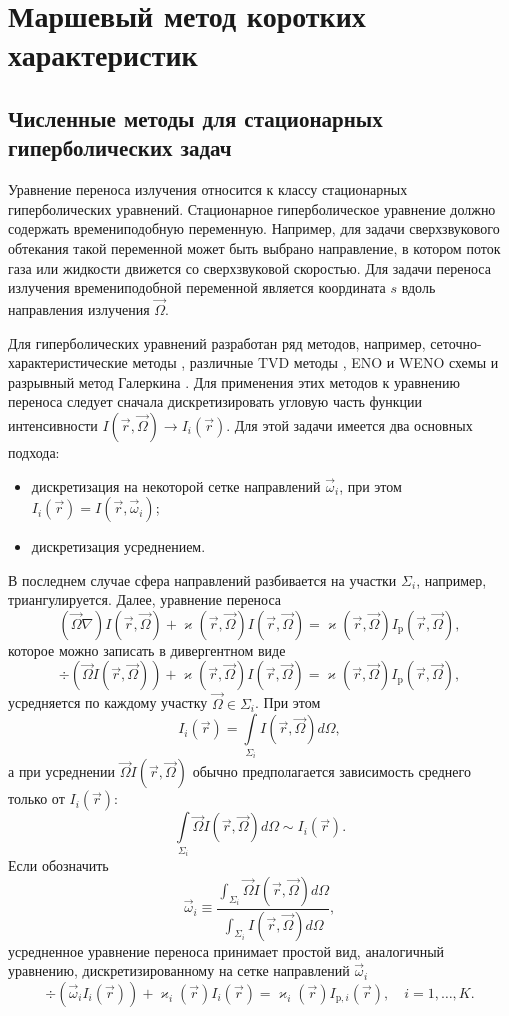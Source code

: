 \chapter{Маршевый метод коротких характеристик}

\section{Численные методы для стационарных гиперболических задач}

Уравнение переноса излучения относится к классу стационарных гиперболических уравнений. Стационарное гиперболическое уравнение должно содержать времениподобную переменную. Например, для задачи сверхзвукового обтекания такой переменной может быть выбрано направление, в котором поток газа или жидкости движется со сверхзвуковой скоростью. Для задачи переноса излучения времениподобной переменной является координата $s$ вдоль направления излучения $\vec \Omega$. 

Для гиперболических уравнений разработан ряд методов, например, сеточно-характеристические методы \cite{magometov1988}, различные TVD методы \cite{Godunov1959,vanLeer1974,Leveque2002,Toro2009}, ENO и WENO схемы \cite{Shu1998} и разрывный метод Галеркина \cite{Cockburn1989}. Для применения этих методов к уравнению переноса следует сначала дискретизировать угловую часть функции интенсивности $I(\vec r, \vec \Omega) \to I_i(\vec r)$. Для этой задачи имеется два основных подхода:
\begin{itemize}
\item дискретизация на некоторой сетке направлений $\vec \omega_i$, при этом $I_i(\vec r) = I(\vec r, \vec \omega_i)$;
\item дискретизация усреднением.
\end{itemize}
В последнем случае сфера направлений разбивается на участки $\Sigma_i$, например, триангулируется. Далее, уравнение переноса 
\[
(\vec \Omega \nabla) I(\vec r, \vec \Omega) + \varkappa(\vec r, \vec \Omega) I(\vec r, \vec \Omega) = \varkappa(\vec r, \vec \Omega) I_\text{p}(\vec r, \vec \Omega),
\]
которое можно записать в дивергентном виде
\[
\div \left(\vec \Omega I(\vec r, \vec \Omega)\right) + \varkappa(\vec r, \vec \Omega) I(\vec r, \vec \Omega) = \varkappa(\vec r, \vec \Omega) I_\text{p}(\vec r, \vec \Omega),
\]
усредняется по каждому участку $\vec \Omega \in \Sigma_i$. При этом
\[
I_i(\vec r) = \int\limits_{\Sigma_i} I(\vec r, \vec \Omega) d\Omega,
\]
а при усреднении $\vec \Omega I(\vec r, \vec \Omega)$ обычно предполагается зависимость среднего только от $I_i(\vec r)$:
\[
\int\limits_{\Sigma_i} \vec \Omega I(\vec r, \vec \Omega) d\Omega \sim I_i(\vec r).
\]
Если обозначить
\[
\vec \omega_i \equiv \frac{\int_{\Sigma_i} \vec \Omega I(\vec r, \vec \Omega) d\Omega}{\int_{\Sigma_i} I(\vec r, \vec \Omega) d\Omega},
\]
усредненное уравнение переноса принимает простой вид, аналогичный уравнению, дискретизированному на сетке направлений $\vec \omega_i$
\begin{equation}
\div (\vec \omega_i I_i(\vec r)) + \varkappa_i(\vec r) I_i(\vec r) = \varkappa_i(\vec r) I_{\text{p},i}(\vec r),\quad i = 1, \dots, K.
\label{eq:grid}
\end{equation}


